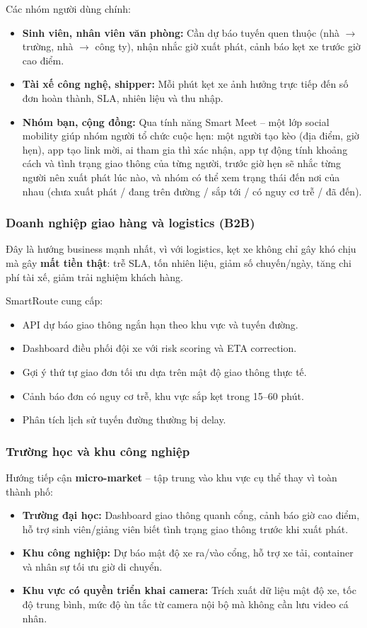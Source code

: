 \documentclass[12pt,a4paper]{article}
\begin{document}
Các nhóm người dùng chính:
\begin{itemize}[leftmargin=1.2cm]
    \item \textbf{Sinh viên, nhân viên văn phòng:} Cần dự báo tuyến quen thuộc (nhà $\rightarrow$ trường, nhà $\rightarrow$ công ty), nhận nhắc giờ xuất phát, cảnh báo kẹt xe trước giờ cao điểm.
    \item \textbf{Tài xế công nghệ, shipper:} Mỗi phút kẹt xe ảnh hưởng trực tiếp đến số đơn hoàn thành, SLA, nhiên liệu và thu nhập.
    \item \textbf{Nhóm bạn, cộng đồng:} Qua tính năng Smart Meet -- một lớp social mobility giúp nhóm người tổ chức cuộc hẹn: một người tạo kèo (địa điểm, giờ hẹn), app tạo link mời, ai tham gia thì xác nhận, app tự động tính khoảng cách và tình trạng giao thông của từng người, trước giờ hẹn sẽ nhắc từng người nên xuất phát lúc nào, và nhóm có thể xem trạng thái đến nơi của nhau (chưa xuất phát / đang trên đường / sắp tới / có nguy cơ trễ / đã đến).
\end{itemize}

\subsubsection{Doanh nghiệp giao hàng và logistics (B2B)}
Đây là hướng business mạnh nhất, vì với logistics, kẹt xe không chỉ gây khó chịu mà gây \textbf{mất tiền thật}: trễ SLA, tốn nhiên liệu, giảm số chuyến/ngày, tăng chi phí tài xế, giảm trải nghiệm khách hàng.

SmartRoute cung cấp:
\begin{itemize}[leftmargin=1.2cm]
    \item API dự báo giao thông ngắn hạn theo khu vực và tuyến đường.
    \item Dashboard điều phối đội xe với risk scoring và ETA correction.
    \item Gợi ý thứ tự giao đơn tối ưu dựa trên mật độ giao thông thực tế.
    \item Cảnh báo đơn có nguy cơ trễ, khu vực sắp kẹt trong 15--60 phút.
    \item Phân tích lịch sử tuyến đường thường bị delay.
\end{itemize}

\subsubsection{Trường học và khu công nghiệp}
Hướng tiếp cận \textbf{micro-market} -- tập trung vào khu vực cụ thể thay vì toàn thành phố:
\begin{itemize}[leftmargin=1.2cm]
    \item \textbf{Trường đại học:} Dashboard giao thông quanh cổng, cảnh báo giờ cao điểm, hỗ trợ sinh viên/giảng viên biết tình trạng giao thông trước khi xuất phát.
    \item \textbf{Khu công nghiệp:} Dự báo mật độ xe ra/vào cổng, hỗ trợ xe tải, container và nhân sự tối ưu giờ di chuyển.
    \item \textbf{Khu vực có quyền triển khai camera:} Trích xuất dữ liệu mật độ xe, tốc độ trung bình, mức độ ùn tắc từ camera nội bộ mà không cần lưu video cá nhân.
\end{itemize}
\end{document}
